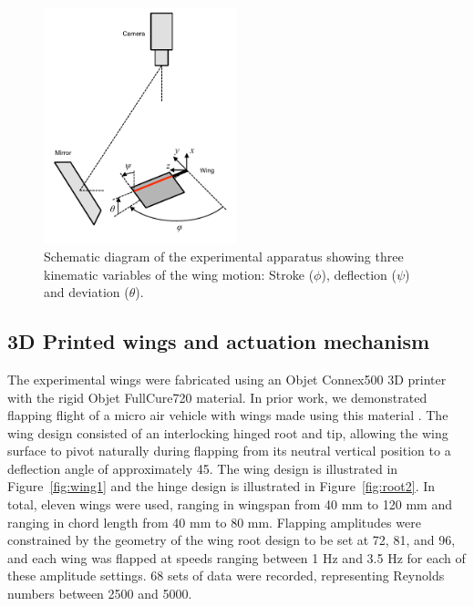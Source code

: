 \documentclass{article}
\begin{document}

\begin{figure}
\centering
\includegraphics[trim=0 15 0 5, clip, width=0.5\textwidth]{figures/apparatus}
\caption{Schematic diagram of the experimental apparatus
  showing three kinematic variables of the wing motion: Stroke ($\phi$),
  deflection ($\psi$) and deviation ($\theta$).\label{fig:apparatus}}
\end{figure}


\subsection*{3D Printed wings and actuation mechanism}
The experimental wings were fabricated using an Objet Connex500 3D printer with
the rigid Objet FullCure720 material. In prior work, we demonstrated flapping
flight of a micro air vehicle with wings made using this material
\cite{richter2011untethered}. The wing design consisted of an interlocking
hinged root and tip, allowing the wing surface to pivot naturally during
flapping from its neutral vertical position to a deflection angle of
approximately 45\textdegree.  The wing design is illustrated in
Figure~\ref{fig:wing1} and the hinge design is illustrated in
Figure~\ref{fig:root2}.  In total, eleven wings were used, ranging in wingspan
from 40 mm to 120 mm and ranging in chord length from 40 mm to 80 mm. Flapping
amplitudes were constrained by the geometry of the wing root design to be set at
72\textdegree, 81\textdegree, and 96\textdegree, and each wing was flapped at
speeds ranging between 1 Hz and 3.5 Hz for each of these amplitude settings.  68
sets of data were recorded, representing Reynolds numbers between 2500 and 5000.
\end{document}
